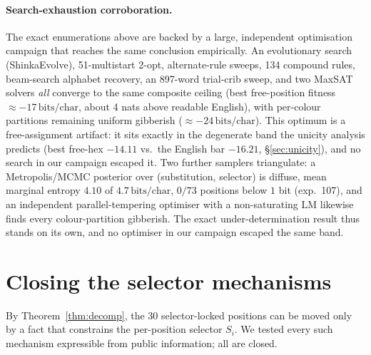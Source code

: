\documentclass[11pt]{article}
\theoremstyle{plain}
\theoremstyle{definition}
\newcommand{\bits}{\,\text{bits/char}}
\begin{document}
\paragraph{Search-exhaustion corroboration.} The exact enumerations above are
backed by a large, independent optimisation campaign that reaches the same
conclusion empirically. An evolutionary search (ShinkaEvolve), 51-multistart 2-opt,
alternate-rule sweeps, 134 compound rules, beam-search alphabet recovery, an 897-word
trial-crib sweep, and two MaxSAT solvers \emph{all} converge to the same composite
ceiling (best free-position fitness $\approx-17\bits$, about 4 nats above readable
English), with per-colour partitions remaining uniform gibberish ($\approx-24\bits$).
This optimum is a free-assignment artifact: it sits exactly in
the degenerate band the unicity analysis predicts (best free-hex $-14.11$ vs.\ the
English bar $-16.21$, \S\ref{sec:unicity}), and no search in our campaign escaped it.
Two further samplers triangulate: a Metropolis/MCMC posterior over (substitution,
selector) is diffuse, mean marginal entropy $4.10$ of $4.7\bits$, $0/73$ positions
below $1$ bit (exp.~107), and an independent parallel-tempering optimiser with a
non-saturating LM likewise finds every colour-partition gibberish. The exact
under-determination result thus stands on its own, and no optimiser in our campaign
escaped the same band.

\section{Closing the selector mechanisms}\label{sec:selectors}

By Theorem~\ref{thm:decomp}, the 30 selector-locked positions can be moved only by a
fact that constrains the per-position selector $S_i$. We tested every such mechanism
expressible from public information; all are closed.
\end{document}
